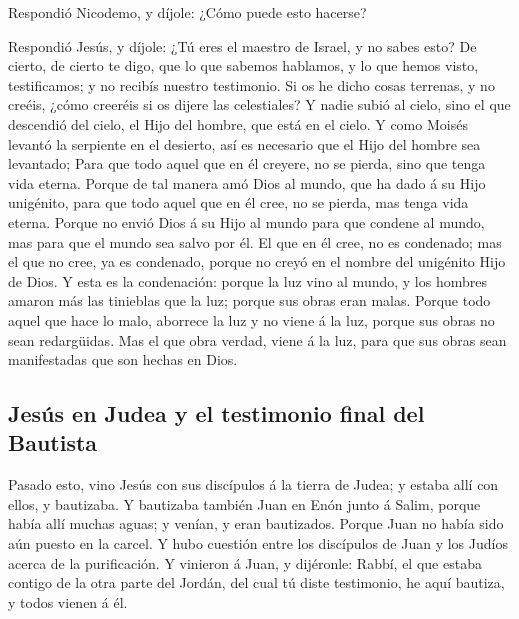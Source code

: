  Respondió Nicodemo, y díjole: ¿Cómo puede esto hacerse?

 Respondió Jesús, y díjole: ¿Tú eres el maestro de
Israel, y no sabes esto?  De cierto, de cierto te digo,
que lo que sabemos hablamos, y lo que hemos visto, testificamos; y no
recibís nuestro testimonio.  Si os he dicho cosas
terrenas, y no creéis, ¿cómo creeréis si os dijere las celestiales?
 Y nadie subió al cielo, sino el que descendió del cielo,
el Hijo del hombre, que está en el cielo.  Y como Moisés
levantó la serpiente en el desierto, así es necesario que el Hijo del
hombre sea levantado;  Para que todo aquel que en él
creyere, no se pierda, sino que tenga vida eterna. 
Porque de tal manera amó Dios al mundo, que ha dado á su Hijo unigénito,
para que todo aquel que en él cree, no se pierda, mas tenga vida eterna.
 Porque no envió Dios á su Hijo al mundo para que condene
al mundo, mas para que el mundo sea salvo por él.  El que
en él cree, no es condenado; mas el que no cree, ya es condenado, porque
no creyó en el nombre del unigénito Hijo de Dios.  Y esta
es la condenación: porque la luz vino al mundo, y los hombres amaron más
las tinieblas que la luz; porque sus obras eran malas. 
Porque todo aquel que hace lo malo, aborrece la luz y no viene á la luz,
porque sus obras no sean redargüidas.  Mas el que obra
verdad, viene á la luz, para que sus obras sean manifestadas que son
hechas en Dios.

\hypertarget{jesuxfas-en-judea-y-el-testimonio-final-del-bautista}{%
\subsection{Jesús en Judea y el testimonio final del
Bautista}\label{jesuxfas-en-judea-y-el-testimonio-final-del-bautista}}

 Pasado esto, vino Jesús con sus discípulos á la tierra
de Judea; y estaba allí con ellos, y bautizaba.  Y
bautizaba también Juan en Enón junto á Salim, porque había allí muchas
aguas; y venían, y eran bautizados.  Porque Juan no había
sido aún puesto en la carcel.  Y hubo cuestión entre los
discípulos de Juan y los Judíos acerca de la purificación.
 Y vinieron á Juan, y dijéronle: Rabbí, el que estaba
contigo de la otra parte del Jordán, del cual tú diste testimonio, he
aquí bautiza, y todos vienen á él.

